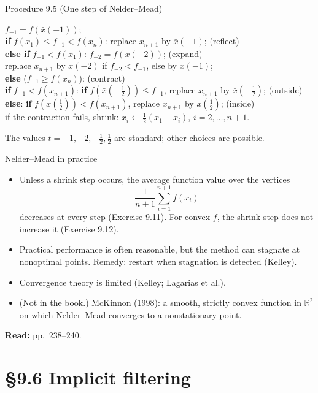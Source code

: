 \documentclass[12pt,aspectratio=169]{beamer}
\newcommand{\readpp}[1]{{\color{red!80!black}\textbf{Read:} #1}}
\newcommand{\R}{\mathbb{R}}
\newcommand{\algblock}[1]{\begin{block}{}#1\end{block}}
\newcommand{\kw}[1]{\textbf{#1}}
\newcommand{\ind}{\hspace*{1.2em}}
\begin{document}
\begin{frame}{Procedure 9.5 (One step of Nelder--Mead)}
  \algblock{
    $f_{-1}=f(\bar x(-1))$;\\
    \kw{if} $f(x_1)\le f_{-1}<f(x_n)$: replace $x_{n+1}$ by $\bar x(-1)$; \hfill (reflect)\\
    \kw{else if} $f_{-1}<f(x_1)$: $f_{-2}=f(\bar x(-2))$; \hfill (expand)\\
    \ind replace $x_{n+1}$ by $\bar x(-2)$ if $f_{-2}<f_{-1}$, else by $\bar x(-1)$;\\
    \kw{else} ($f_{-1}\ge f(x_n)$): \hfill (contract)\\
    \ind \kw{if} $f_{-1}<f(x_{n+1})$: \kw{if} $f(\bar x(-\tfrac12))\le f_{-1}$, replace $x_{n+1}$ by $\bar x(-\tfrac12)$; \hfill (outside)\\
    \ind \kw{else}: \kw{if} $f(\bar x(\tfrac12))<f(x_{n+1})$, replace $x_{n+1}$ by $\bar x(\tfrac12)$; \hfill (inside)\\
    \ind if the contraction fails, shrink: $x_i\leftarrow\tfrac12(x_1+x_i)$, $i=2,\dots,n+1$.
  }
  The values $t=-1,-2,-\tfrac12,\tfrac12$ are standard; other choices are possible.
\end{frame}

\begin{frame}{Nelder--Mead in practice}
  \begin{itemize}
    \item Unless a shrink step occurs, the average function value over the vertices
      \begin{equation}
        \frac1{n+1}\sum_{i=1}^{n+1}f(x_i) \tag{9.29}
      \end{equation}
      decreases at every step (Exercise 9.11). For convex $f$, the shrink step does not increase it (Exercise 9.12).
    \item Practical performance is often reasonable, but the method can \alert{stagnate at nonoptimal points}.
      Remedy: restart when stagnation is detected (Kelley).
    \item Convergence theory is limited (Kelley; Lagarias et al.).
    \item (Not in the book.) McKinnon (1998): a smooth, strictly convex function in $\R^2$
      on which Nelder--Mead converges to a nonstationary point.
  \end{itemize}
  \readpp{pp.~238--240.}
\end{frame}

\section{\S9.6 Implicit filtering}
\end{document}
